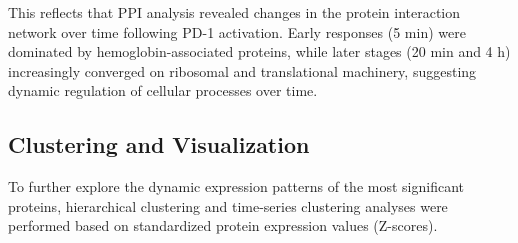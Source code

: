 \documentclass{article}
\begin{document}
      This reflects that PPI analysis revealed changes in the protein interaction network over time following PD-1 activation. Early responses (5 min) were dominated by hemoglobin-associated proteins, while later stages (20 min and 4 h) increasingly converged on ribosomal and translational machinery, suggesting dynamic regulation of cellular processes over time.

    \subsection{Clustering and Visualization}

      To further explore the dynamic expression patterns of the most significant proteins, hierarchical clustering and time-series clustering analyses were performed based on standardized protein expression values (Z-scores). 
      
\end{document}
